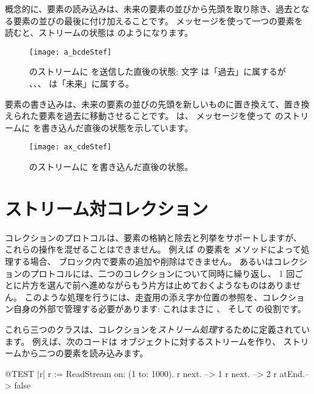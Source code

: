 \documentclass[a4paper,10pt,twoside]{book}
\begin{document}
概念的に、要素の読み込みは、未来の要素の並びから先頭を取り除き、過去となる要素の並びの最後に付け加えることです。
 メッセージを使って一つの要素を読むと、ストリームの状態は のようになります。

\begin{figure}[ht]
\centerline{\texttt{[image: a\_bcdeStef]}}
\caption{ のストリームに  を送信した直後の状態: 文字  は「過去」に属するが 、、、 は「未来」に属する。}
\vspace{.2in}
\end{figure}

要素の書き込みは、未来の要素の並びの先頭を新しいものに置き換えて、置き換えられた要素を過去に移動させることです。
 は、  メッセージを使って のストリームに  を書き込んだ直後の状態を示しています。

\begin{figure}[ht]
\centerline{\texttt{[image: ax\_cdeStef]}}
\caption{ のストリームに  を書き込んだ直後の状態。}
\vspace{.2in}
\end{figure}

\section{ストリーム対コレクション}

コレクションのプロトコルは、要素の格納と除去と列挙をサポートしますが、
これらの操作を混ぜることはできません。
例えば  の要素を  メソッドによって処理する場合、
 ブロック内で要素の追加や削除はできません。
あるいはコレクションのプロトコルには、二つのコレクションについて同時に繰り返し、
1  回ごとに片方を選んで前へ進めながらもう片方は止めておくようなものはありません。
このような処理を行うには、走査用の添え字か位置の参照を、コレクション自身の外部で管理する必要があります:
これはまさに 、 そして  の役割です。

これら三つのクラスは、コレクションを\emph{ストリーム処理}するために定義されています。
例えば、次のコードは  オブジェクトに対するストリームを作り、
ストリームから二つの要素を読み込みます。
\begin{code}{@TEST |r|}
r := ReadStream on: (1 to: 1000).
r next.   --> 1
r next.   --> 2
r atEnd.--> false
\end{code}
\end{document}
